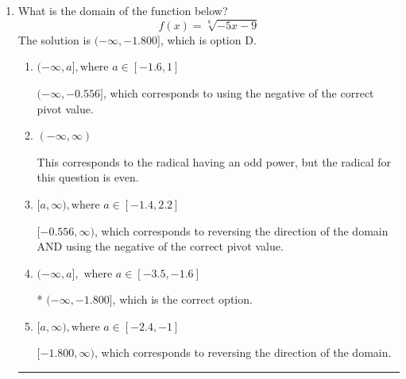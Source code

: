\documentclass{extbook}[14pt]
\newcommand{\litem}[1]{\item #1

\rule{\textwidth}{0.4pt}}
\begin{document}
\begin{enumerate}\litem{
What is the domain of the function below?
\[ f(x) = \sqrt[8]{-5 x - 9} \]The solution is \( (-\infty, -1.800] \), which is option D.\begin{enumerate}[label=\Alph*.]
\item \( (-\infty, a], \text{where } a \in [-1.6, 1] \)

$(-\infty, -0.556]$, which corresponds to using the negative of the correct pivot value.
\item \( (-\infty, \infty) \)

This corresponds to the radical having an odd power, but the radical for this question is even.
\item \( [a, \infty), \text{where } a \in [-1.4, 2.2] \)

$[-0.556, \infty)$, which corresponds to reversing the direction of the domain AND using the negative of the correct pivot value.
\item \( (-\infty, a], \text{ where } a \in [-3.5, -1.6] \)

* $(-\infty, -1.800]$, which is the correct option.
\item \( [a, \infty), \text{where } a \in [-2.4, -1] \)

 $[-1.800, \infty)$, which corresponds to reversing the direction of the domain.
\end{enumerate}

}
\end{enumerate}
\end{document}
